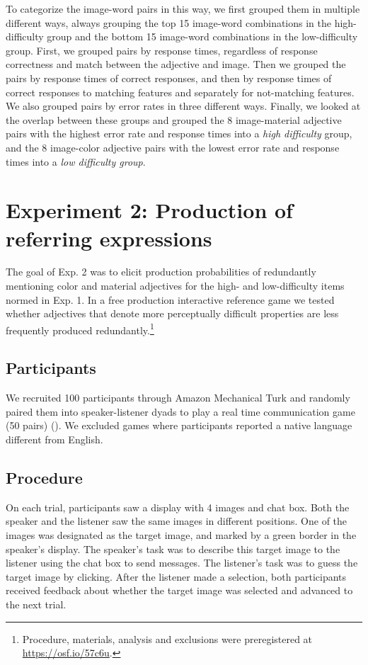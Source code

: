 \documentclass[12pt,letterpaper]{article}
\begin{document}
To categorize the image-word pairs in this way, we first grouped them in multiple different ways, always grouping the top 15 image-word combinations in the high-difficulty group and the bottom 15 image-word combinations in the low-difficulty group. First, we grouped pairs by response times, regardless of response correctness and match between the adjective and image. Then we grouped the pairs by response times of correct responses, and then by response times of correct responses to matching features and separately for not-matching features. We also grouped pairs by error rates in three different ways. Finally, we looked at the overlap between these groups and grouped the 8 image-material adjective pairs with the highest error rate and response times into a \textit{high difficulty} group, and the 8 image-color adjective pairs with the lowest error rate and response times into a \textit{low difficulty group}.

\section{Experiment 2: Production of referring expressions} 

The goal of Exp. 2 was to elicit production probabilities of redundantly mentioning color and material adjectives for the high- and low-difficulty items normed in Exp. 1. In a free production interactive reference game we tested whether adjectives that denote more perceptually difficult properties are less frequently produced redundantly.\footnote{Procedure, materials, analysis and exclusions were preregistered at \href {https://osf.io/57c6u}{https://osf.io/57c6u}.}

\subsection{Participants} 

We recruited 100 participants through Amazon Mechanical Turk and randomly paired them into speaker-listener dyads to play a real time communication game (50 pairs) (\citealt{Hawkins2015}). We excluded games where participants reported a native language different from English.

\subsection{Procedure} 

On each trial, participants saw a display with 4 images and chat box. Both the speaker and the listener saw the same images in different positions. One of the images was designated as the target image, and marked by a green border in the speaker's display. The speaker's task was to describe this target image to the listener using the chat box to send messages. The listener's task was to guess the target image by clicking. After the listener made a selection, both participants received feedback about whether the target image was selected and advanced to the next trial. 
\end{document}
